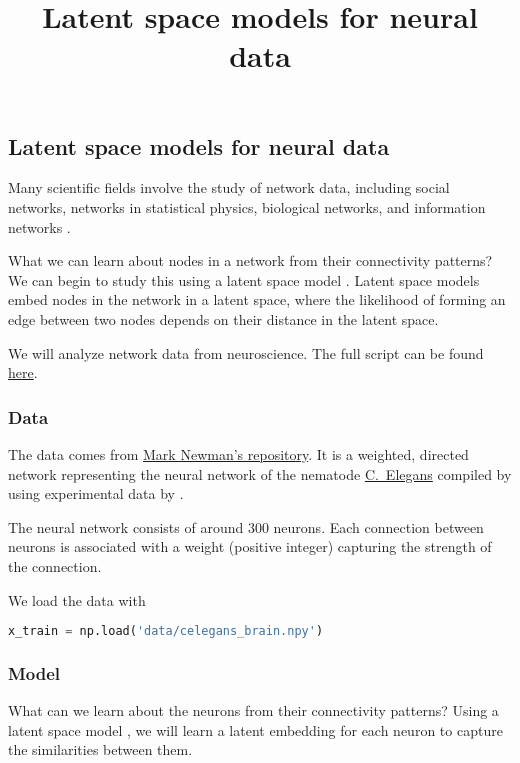 \title{Latent space models for neural data}

\subsection{Latent space models for neural data}

Many scientific fields involve the study of network data, including
social networks, networks in statistical physics, biological
networks, and information networks
\citep{newman2010networks,goldenberg2010survey}.

What we can learn about nodes in a network from their connectivity patterns?
We can begin to study this using a latent space model \citep{hoff2002latent}.
Latent space models embed nodes in the network in a latent space,
where the likelihood of forming an edge between two nodes depends on
their distance in the latent space.

We will analyze network data from neuroscience.
The full script can be found
\href{https://github.com/blei-lab/edward/blob/master/examples/latent_space_model.py}{here}.

\subsubsection{Data}

The data comes from \href{http://www-personal.umich.edu/~mejn/netdata/}{Mark Newman's repository}.
It is a weighted, directed network representing the neural network of
the nematode
\href{https://en.wikipedia.org/wiki/Caenorhabditis_elegans}{C.~Elegans}
compiled by \citet{watts1998collective} using experimental data
by \citet{white1986structure}.

The neural network consists of around $300$ neurons. Each connection
between neurons
is associated with a weight (positive integer) capturing the strength
of the connection.

We load the data with
\begin{lstlisting}[language=Python]
x_train = np.load('data/celegans_brain.npy')
\end{lstlisting}

\subsubsection{Model}

What can we learn about the neurons from their connectivity patterns? Using
a latent space model \citep{hoff2002latent}, we will learn a latent
embedding for each neuron to capture the similarities between them.

